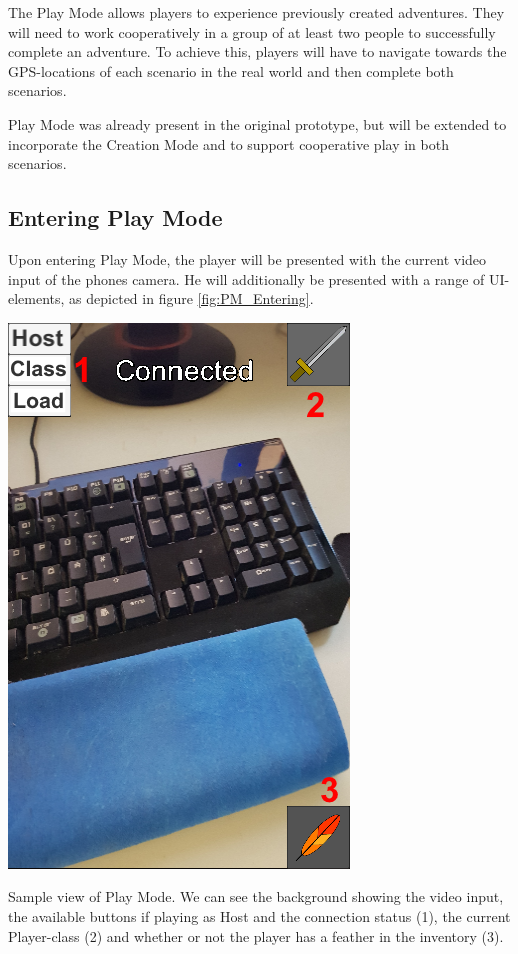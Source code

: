 \documentclass{sigchi-ext}
\begin{document}
The Play Mode allows players to experience previously created adventures. They will need to work cooperatively in a group of at least two people to successfully complete an adventure. To achieve this, players will have to navigate towards the GPS-locations of each scenario in the real world and then complete both scenarios. 

Play Mode was already present in the original prototype, but will be extended to incorporate the Creation Mode and to support cooperative play in both scenarios.

\subsection{Entering Play Mode}

Upon entering Play Mode, the player will be presented with the current video input of the phones camera. He will additionally be presented with a range of UI-elements, as depicted in figure \ref{fig:PM_Entering}.

\begin{marginfigure}[5pc]
	\begin{minipage}{\marginparwidth}
		\centering
		\includegraphics[width=1\marginparwidth]{figures/PM_Entering}
		\caption{Sample view of Play Mode. We can see the background showing the video input, the available buttons if playing as Host and the connection status (1), the current Player-class (2) and whether or not the player has a feather in the inventory (3). }~\label{fig:PM_Entering}
	\end{minipage}
\end{marginfigure}
\end{document}
